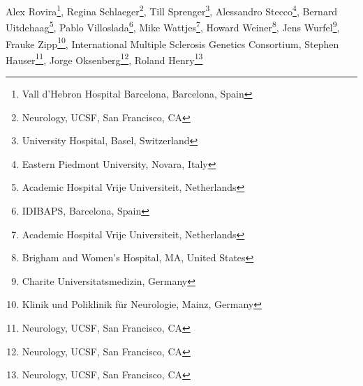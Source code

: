 Alex Rovira\footnote[5]{Vall d’Hebron Hospital Barcelona, Barcelona, Spain},
Regina Schlaeger\footnote[1]{Neurology, UCSF, San Francisco, CA},
Till Sprenger\footnote[13]{University Hospital, Basel, Switzerland},
Alessandro Stecco\footnote[6]{Eastern Piedmont University, Novara, Italy},
Bernard Uitdehaag\footnote[16]{Academic Hospital Vrije Universiteit, Netherlands},
Pablo Villoslada\footnote[14]{IDIBAPS, Barcelona, Spain},
Mike Wattjes\footnote[16]{Academic Hospital Vrije Universiteit, Netherlands},
Howard Weiner\footnote[4]{Brigham and Women's Hospital, MA, United States},
Jens Wurfel\footnote[2]{Charite Universitatsmedizin, Germany},
Frauke Zipp\footnote[10]{Klinik und Poliklinik für Neurologie, Mainz, Germany},
International Multiple Sclerosis Genetics Consortium,
Stephen Hauser\footnote[1]{Neurology, UCSF, San Francisco, CA},
Jorge Oksenberg\footnote[1]{Neurology, UCSF, San Francisco, CA},
Roland Henry\footnote[1]{Neurology, UCSF, San Francisco, CA}

\else %
\author[1]{Anisha Keshavan}
\author[2]{Friedmann Paul}
\author[3]{Mona Beyer}
\author[1]{Alyssa Zhu}
\author[1]{Nico Papinutto}
\author[1]{William Stern}
\author[13]{Michael Aman}
\author[4]{Rohit Bakshi}
\author[1]{Antje Bischof}
\author[5]{Manuel Comabella}
\author[1]{Jason Crane}
\author[6]{Sandra D’Alfonso}
\author[7]{Benedicte Dubois}
\author[8]{Massimo Filippi}
\author[9]{Bertrand Fontaine}
\author[7]{Ann Goris}
\author[13]{Laura Gaetano}
\author[10]{Sergiu Groppa}
\author[11]{David Hafler}
\author[3]{Hanne Harbo}
\author[12]{Bernhard Hemmer}
\author[1]{Kesshi Jordan}
\author[13]{Ludwig Kappos}
\author[1]{Gina Kirkish}
\author[14]{Sara Llufriu}
\author[13]{Stefano Magon}
\author[8]{Filippo Martinelli-Boneschi}
\author[15]{Jacob McCauley}
\author[5]{Xavier Montalban}
\author[12]{Mark Muhlau}
\author[11]{Daniel Pelletier} %
\author[15]{Margaret Pericak-Vance}
\author[9]{Isabelle Rebeix}
\author[8]{Maria Rocca}
\author[5]{Alex Rovira}
\author[1]{Regina Schlaeger}
\author[13]{Till Sprenger} %
\author[6]{Alessandro Stecco}
\author[16]{Bernard Uitdehaag}
\author[14]{Pablo Villoslada}
\author[13]{Mike Wattjies}
\author[4]{Howard Weiner}
\author[2]{Jens Wurfel}
\author[10]{Frauke Zipp}
\author[17]{International Multiple Sclerosis Genetics Consortium}
\author[1]{Stephen Hauser}
\author[1]{Jorge Oksenberg}
\author[1]{Roland Henry}

